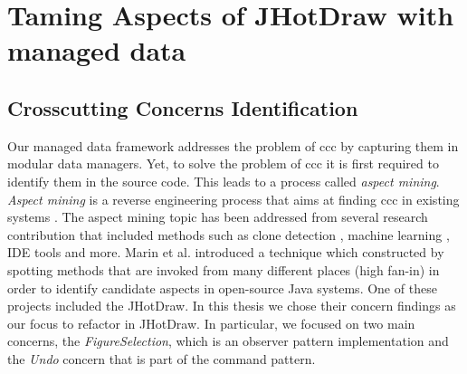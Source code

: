 
\chapter{Taming Aspects of JHotDraw with managed data}\label{AspectRefactoring}

\section{Crosscutting Concerns Identification}
Our managed data framework addresses the problem of \ac{ccc} by capturing them in modular data managers.
Yet, to solve the problem of \ac{ccc} it is first required to identify them in the source code.
This leads to a process called \textit{aspect mining}.
\textit{Aspect mining} is a reverse engineering process that aims at finding \ac{ccc} in existing systems \cite{marin2004identifying}.
The aspect mining topic has been addressed from several research contribution that included methods such as clone detection \cite{bruntink2005use}, machine learning \cite{shepherd2004design}, IDE tools \cite{robillard2002concern} and more. 
Marin et al. \cite{marin2004identifying} introduced a technique which constructed by spotting methods that are invoked from many different places (high fan-in) in order to identify candidate aspects in open-source Java systems.
One of these projects included the JHotDraw.
In this thesis we chose their concern findings as our focus to refactor in JHotDraw.
In particular, we focused on two main concerns, the \textit{FigureSelection}, which is an observer pattern implementation and the \textit{Undo} concern that is part of the command pattern.

